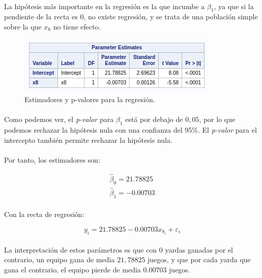 \documentclass{article}
\begin{document}
  \paragraph{}
  La hipótesis más importante en la regresión es la que incumbe a $\beta_1$, ya que si la pendiente de la recta es 0, no existe regresión, y se trata de una población simple sobre la que $x_8$ no tiene efecto.

  \begin{figure}[H]
    \centering
    \includegraphics[width=.5\textwidth]{img/montgomery/procreg.png}
    \caption{Estimadores y p-valores para la regresión.}
    \label{img:mont-procreg}
  \end{figure}

  \paragraph{}
  Como podemos ver, el \textit{p-valor} para $\beta_1$ está por debajo de $0,05$, por lo que podemos rechazar la hipótesis nula con una confianza del 95\%. El \textit{p-valor} para el intercepto también permite rechazar la hipótesis nula.

  \paragraph{}
  Por tanto, los estimadores son:

  \begin{align}
    \hat\beta_0 = 21.78825\\
    \hat\beta_1 = -0.00703
  \end{align}

  \paragraph{}
  Con la recta de regresión:

  \begin{equation}
    y_i = 21.78825 -0.00703x_8_i + \varepsilon_i
  \end{equation}

  \paragraph{}
  La interpretación de estos parámetros es que con 0 yardas ganadas por el contrario, un equipo gana de media $21,78825$ juegos, y que por cada yarda que gana el contrario, el equipo pierde de media $0.00703$ juegos.
\end{document}
